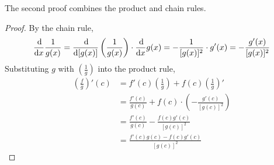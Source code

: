 The second proof combines the product and chain rules. 
\begin{proof}
  By the chain rule,
  \[
    \frac{\operatorname{d\!}}{\operatorname{d\!} x} \frac{1}{g(x)} = \frac{\operatorname{d\!}}{\operatorname{d\!} \, [g(x)]} \left(\frac{1}{g(x)}\right) \cdot \frac{\operatorname{d\!}}{\operatorname{d\!} x} g(x) = -\frac{1}{[g(x)] ^ 2} \cdot g'(x) = -\frac{g'(x)}{[g(x)] ^ 2}
  \]
  Substituting $g$ with $\left(\frac{1}{g}\right)$ into the product rule,
  \begin{align*}
    \left(\frac{f}{g}\right)'(c) &= f'(c) \left(\frac{1}{g}\right) + f(c) \left(\frac{1}{g}\right)' \\
    &= \frac{f'(c)}{g(c)} + f(c) \cdot \left(-\frac{g'(c)}{[g(c)] ^ 2}\right) \\
    &= \frac{f'(c)}{g(c)} - \frac{f(c)g'(c)}{[g(c)] ^ 2} \\ 
    &= \frac{f'(c)g(c) - f(c)g'(c)}{[g(c)] ^ 2}
  \end{align*}
\end{proof}


